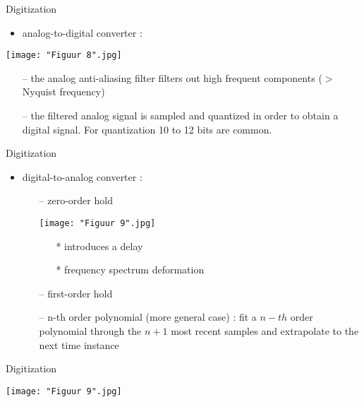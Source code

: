 \begin{frame}{Digitization}

\begin{itemize}
\item analog-to-digital converter :
\end{itemize}
\begin{center}
\texttt{[image: "Figuur 8".jpg]}
\end{center}

\begin{itemize}
\item[--] the analog anti-aliasing filter filters out high frequent
components ($>$ Nyquist frequency)
\item[--] the filtered analog signal is sampled and quantized
in order to obtain a digital signal. For quantization
10 to 12 bits are common.
\end{itemize}
\end{frame}

\begin{frame}{Digitization}
\begin{itemize}
\item digital-to-analog converter :
    \begin{itemize}
    \item[--]zero-order hold
    
    \begin{center}
        \texttt{[image: "Figuur 9".jpg]}
    \end{center}
        \begin{itemize}
        \item[*] introduces a delay
        \item[*] frequency spectrum deformation
        \end{itemize}
    \item[--]first-order hold
    \item[--]n-th order polynomial (more general case) : fit a $n-th$
order polynomial through the $n+1$ most recent
samples and extrapolate to the next time instance
    \end{itemize}
\end{itemize}
\end{frame}

\begin{frame}{Digitization}

\begin{center}
        \texttt{[image: "Figuur 9".jpg]}
\end{center}
\end{frame}



